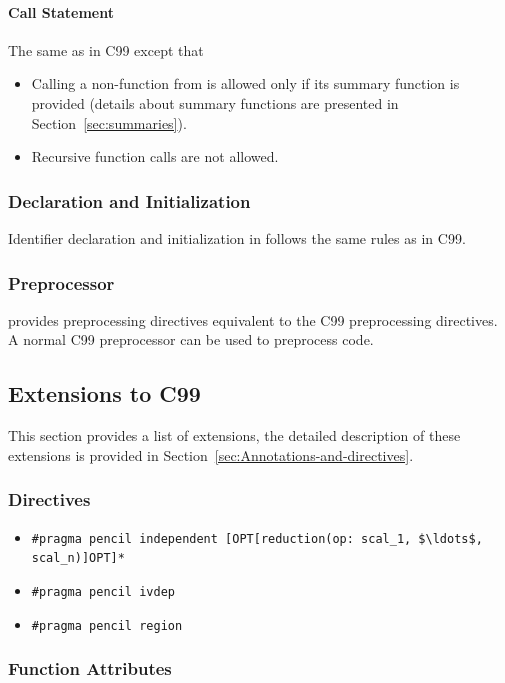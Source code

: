 \paragraph{Call Statement}
The same as in C99 except that
\begin{itemize}
 \item Calling a non-\pencil function from \pencil
   is allowed only if its summary function is provided
   (details about summary functions are presented in
    Section~\ref{sec:summaries}).
 \item Recursive function calls are not allowed.
\end{itemize}

\subsubsection{Declaration and Initialization}
Identifier declaration and initialization in \pencil follows the same
rules as in C99.

\subsubsection{Preprocessor}
\pencil provides preprocessing directives equivalent to the C99
preprocessing directives.
A normal C99 preprocessor can be used to preprocess \pencil code.

\subsection{\pencil Extensions to C99}
\label{pencil-extension-short}

This section provides a list of \pencil extensions, the detailed
description of these extensions is provided
in Section~\ref{sec:Annotations-and-directives}.

\subsubsection*{Directives}
\label{sec:for-directives}

\begin{itemize}
\item \lstinline!#pragma pencil independent [OPT[reduction(op: scal_1, $\ldots$, scal_n)]OPT]*!
\item \lstinline!#pragma pencil ivdep!
\item \lstinline!#pragma pencil region!
\end{itemize}

\subsubsection*{Function Attributes}

